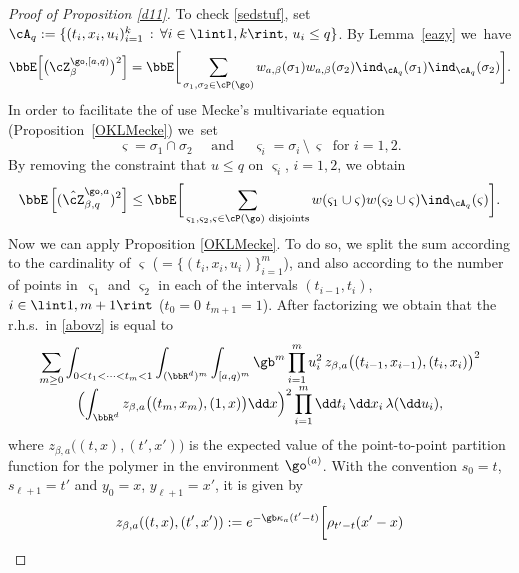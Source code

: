 \begin{proof}[Proof of Proposition \ref{d11}]
To check \eqref{sedstuf}, set
$\cA_q:=\{ (t_i,x_i,u_i)^k_{i=1} \, : \, \forall i\in \lint 1,k\rint,\, u_i\le q \}$.
By Lemma~\ref{eazy} we~have
\begin{equation}
\bbE \Bigl[ \bigl(\cZ^{\go,[a,q)}_{\beta} \bigr)^2 \Bigr]= \bbE \bigg[ \sum_{\sigma_1, \sigma_2 \in \cP(\go)} w_{a,\beta}(\sigma_1)w_{a,\beta}(\sigma_2) \ind_{\cA_q}(\sigma_1)\ind_{\cA_q}(\sigma_2) \bigg].
\end{equation}
In order to facilitate the of use Mecke's multivariate equation (Proposition~\ref{OKLMecke}) we~set%
\begin{equation}\label{lanotat}
\varsigma=\sigma_1 \cap \sigma_2 \quad \text{ and } \quad \varsigma_i=\sigma_i\, \setminus\, \varsigma \ \text{ for } i=1,2.
\end{equation}
By removing the constraint that $u\leq q$ on $\varsigma_i$, $i=1,2$, we obtain
\begin{equation}\label{abovz}
\bbE \left[ (\hat \cZ^{\go,a}_{\beta,q})^2 \right]\le
\bbE \bigg[ \sum_{\varsigma_1, \varsigma_2, \varsigma\in \cP(\go) \text{ disjoints}} w(\varsigma_1\cup \varsigma)w(\varsigma_2\cup \varsigma) \ind_{\cA_q}(\varsigma) \bigg].
\end{equation}
Now we can apply
Proposition \ref{OKLMecke}. To do so, we split the sum according to the cardinality of $\varsigma$ ($=\{ (t_i,x_i,u_i)\}^m_{i=1}$), and also according to the number of points in~$\varsigma_1$ and $\varsigma_2$
in each of the intervals $(t_{i-1},t_i)$, $i\in\lint 1, m+1\rint$ ($t_0=0$ $t_{m+1}=1$).
After factorizing
we obtain that the r.h.s.\ in \eqref{abovz} is equal to\vspace*{-5pt}
\begin{multline}\label{zruc}
\sum_{m \ge 0} \int_{0<t_1<\dots<t_m<1} \int_{ (\bbR^d)^m} \int_{[a,q)^m} \gb^{m}
\prod_{i=1}^{m} u_i^2 \, z_{\beta,a}\bigl((t_{i-1},x_{i-1}), (t_{i},x_{i}) \bigr)^2
\\[-5pt]
\Bigl(\int_{\bbR^d} z_{\beta,a}\bigl((t_m,x_m), (1,x) \bigr) \dd x \Bigr)^2 \prod_{i=1}^m \dd t_i\, \dd x_i\, \lambda(\dd u_i),
\end{multline}
where $z_{\beta,a}\bigl((t,x), (t',x') \bigr)$ is the expected value of the point-to-point partition function for the polymer in the environment $\go^{(a)}$. With the convention $s_0=t$, $s_{\ell+1}=t'$ and $y_0=x$, $y_{\ell+1} =x'$, it is given by\vspace*{-5pt}
\begin{multline}\label{zruc2}
z_{\beta,a} ((t,x), (t',x'))
:= e^{ -\gb \kappa_a (t'-t)}
\bigg[ \rho_{t'-t}(x'-x)\\

\end{multline}
\end{proof}
